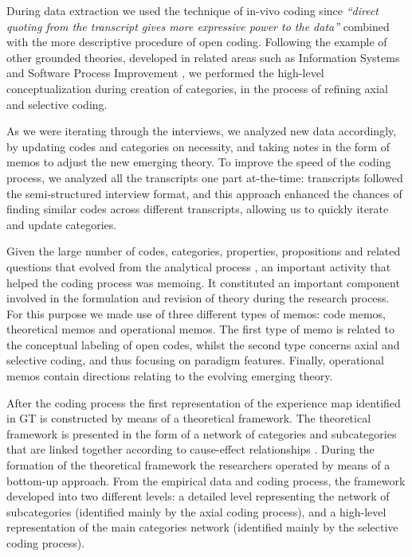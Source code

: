 \documentclass[10pt,journal,letterpaper,compsoc]{IEEEtran}
\begin{document}
During data extraction we used the technique of in-vivo coding since 
\textit{``direct quoting from the transcript gives more expressive power to the 
data''} \cite{ColinRobson2009} combined with the more descriptive procedure of 
open coding. Following the example of other grounded theories, developed in 
related areas such as Information Systems \cite{Orlikowski1993} and Software 
Process Improvement \cite{Coleman2006}, we performed the high-level 
conceptualization during creation of categories, in the process of refining 
axial and selective coding.

As we were iterating through the interviews, we analyzed new data accordingly, 
by updating codes and categories on necessity, and taking notes in the form of 
memos to adjust the new emerging theory. To improve the speed of the coding 
process, we analyzed all the transcripts one part at-the-time: transcripts 
followed the semi-structured interview format, and this approach enhanced the 
chances of finding similar codes across different transcripts, allowing us to 
quickly iterate and update categories.

Given the large number of codes, categories, properties, propositions and 
related questions that evolved from the analytical process \cite{Corbin1990}, 
an important activity that helped the coding process was memoing. It constituted 
an important component involved in the formulation and revision of theory 
during the research process. For this purpose we made use of three different 
types of memos: code memos, theoretical memos and operational memos. The first 
type of memo is related to the conceptual labeling of open codes, whilst the 
second type concerns axial and selective coding, and thus focusing on paradigm 
features. Finally, operational memos contain directions relating to the evolving 
emerging theory.

After the coding process the first representation of the experience map 
identified in GT is constructed by means of a theoretical framework. The 
theoretical framework is presented in the form of a network of categories and 
subcategories that are linked together according to cause-effect relationships 
\cite{Corbin1990}. During the formation of the theoretical framework the 
researchers operated by means of a  bottom-up approach. From the empirical data 
and coding process, the framework developed into two different levels: a 
detailed level representing the network of subcategories (identified mainly by 
the axial coding process), and a high-level representation of the main 
categories network (identified mainly by the selective coding process).
\end{document}
